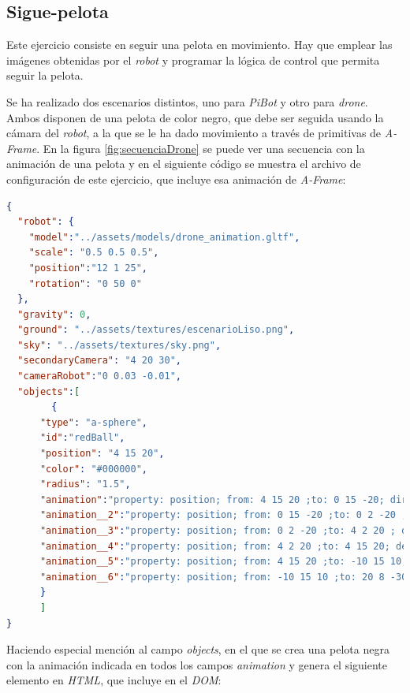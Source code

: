 \subsection{Sigue-pelota}
\label{subsec:pelota}

Este ejercicio consiste en seguir una pelota en movimiento. Hay que emplear las imágenes obtenidas por el \textit{robot} y programar la lógica de control que permita seguir la pelota.

Se ha realizado dos escenarios distintos, uno para \textit{PiBot} y otro para \textit{drone}.
Ambos disponen de una pelota de color negro, que debe ser seguida usando la cámara del \textit{robot}, a la que se le ha dado movimiento a través de primitivas de \textit{A-Frame}. En la figura \ref{fig:secuenciaDrone} se puede ver una secuencia con la animación de una pelota y en el siguiente código se muestra el archivo de configuración de este ejercicio, que incluye esa animación de \textit{A-Frame}:\\

\begin{lstlisting}[language=json]
{
  "robot": {
    "model":"../assets/models/drone_animation.gltf",
    "scale": "0.5 0.5 0.5",
    "position":"12 1 25",
    "rotation": "0 50 0"
  },
  "gravity": 0,
  "ground": "../assets/textures/escenarioLiso.png",
  "sky": "../assets/textures/sky.png",
  "secondaryCamera": "4 20 30",
  "cameraRobot":"0 0.03 -0.01",
  "objects":[
        {
      "type": "a-sphere",
      "id":"redBall",
      "position": "4 15 20",
      "color": "#000000",
      "radius": "1.5",
      "animation":"property: position; from: 4 15 20 ;to: 0 15 -20; dir: alternate; dur: 10000; loop: true",
      "animation__2":"property: position; from: 0 15 -20 ;to: 0 2 -20 ; delay: 10000; dir: alternate; dur: 10000; loop: true",
      "animation__3":"property: position; from: 0 2 -20 ;to: 4 2 20 ; delay: 20000; dir: alternate; dur: 10000; loop: true",
      "animation__4":"property: position; from: 4 2 20 ;to: 4 15 20; delay: 30000; dir: alternate; dur: 10000; loop: true",
      "animation__5":"property: position; from: 4 15 20 ;to: -10 15 10; delay: 40000; dir: alternate; dur: 10000; loop: true",
      "animation__6":"property: position; from: -10 15 10 ;to: 20 8 -30; delay: 50000; dir: alternate; dur: 10000; loop: true"
      }
      ]
}
\end{lstlisting} 


 Haciendo especial mención al campo \textit{objects}, en el que se crea una pelota negra con la animación indicada en todos los campos \textit{animation} y genera el siguiente elemento en \textit{HTML}, que incluye en el \textit{DOM}:

